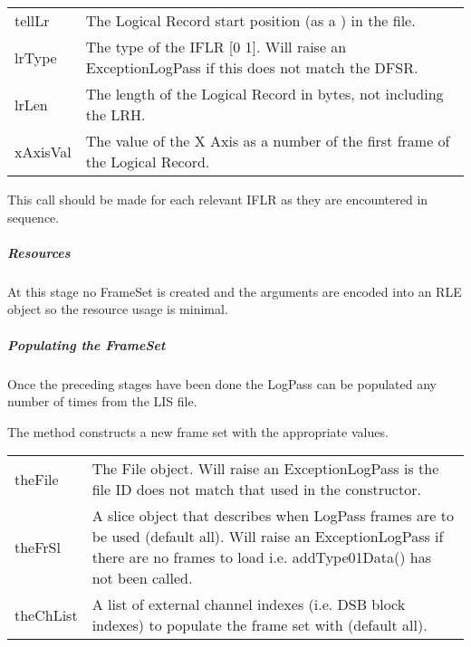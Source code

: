 \documentclass[letterpaper,10pt,english]{sphinxmanual}
\begin{document}
\begin{savenotes}\sphinxattablestart
\centering
\begin{tabulary}{\linewidth}[t]{|T|T|}
\hline
{}\relax &\relax \\
\hline
tellLr
&
The Logical Record start position (as a ) in the file.
\\
\hline
lrType
&
The type of the IFLR {[}0 \textbar{} 1{]}. Will raise an ExceptionLogPass if this does not match the DFSR.
\\
\hline
lrLen
&
The length of the Logical Record in bytes, not including the LRH.
\\
\hline
xAxisVal
&
The value of the X Axis as a number of the first frame of the Logical Record.
\\
\hline
\end{tabulary}
\par
\sphinxattableend\end{savenotes}

This call should be made for each relevant IFLR as they are encountered in sequence.


\subparagraph{Resources}
\label{\detokenize{ref/LIS/core/LogPass:id1}}
At this stage no FrameSet is created and the arguments are encoded into an RLE object so the resource usage is minimal.


\subparagraph{Populating the FrameSet}
\label{\detokenize{ref/LIS/core/LogPass:populating-the-frameset}}
Once the preceding stages have been done the LogPass can be populated any number of times from the LIS file.

The method  constructs a new frame set with the appropriate values.


\begin{savenotes}\sphinxattablestart
\centering
\begin{tabulary}{\linewidth}[t]{|T|T|}
\hline
{}\relax &\relax \\
\hline
theFile
&
The File object. Will raise an ExceptionLogPass is the file ID does not match that used in the constructor.
\\
\hline
theFrSl
&
A slice object that describes when LogPass frames are to be used (default all). Will raise an ExceptionLogPass if there are no frames to load i.e. addType01Data() has not been called.
\\
\hline
theChList
&
A list of external channel indexes (i.e. DSB block indexes) to populate the frame set with (default all).
\\
\hline
\end{tabulary}
\par
\sphinxattableend\end{savenotes}
\end{document}
